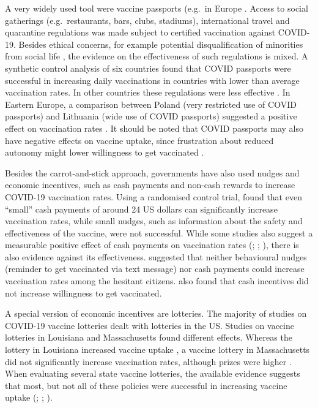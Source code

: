 \documentclass{scrbook}
\begin{document}
A very widely used tool were vaccine passports (e.g.~in Europe
\parencite{niestadt_domestic_2021}. Access to social gatherings
(e.g.~restaurants, bars, clubs, stadiums), international travel and
quarantine regulations was made subject to certified vaccination against
COVID-19. Besides ethical concerns, for example potential
disqualification of minorities from social life
\parencite{gostin_digital_2021}, the evidence on the effectiveness of
such regulations is mixed. A synthetic control analysis of six countries
found that COVID passports were successful in increasing daily
vaccinations in countries with lower than average vaccination rates. In
other countries these regulations were less effective
\parencite{mills_effect_2022}. In Eastern Europe, a comparison between
Poland (very restricted use of COVID passports) and Lithuania (wide use
of COVID passports) suggested a positive effect on vaccination rates
\parencite{walkowiak_covid-19_2021}. It should be noted that COVID
passports may also have negative effects on vaccine uptake, since
frustration about reduced autonomy might lower willingness to get
vaccinated \parencite{porat_vaccine_2021}.

Besides the carrot-and-stick approach, governments have also used nudges
and economic incentives, such as cash payments and non-cash rewards to
increase COVID-19 vaccination rates. Using a randomised control trial,
\textcite{campos-mercade_monetary_2021} found that even ``small'' cash
payments of around 24 US dollars can significantly increase vaccination
rates, while small nudges, such as information about the safety and
effectiveness of the vaccine, were not successful. While some studies
also suggest a measurable positive effect of cash payments on
vaccination rates (\cite{wong_guaranteed_2022};
\cite{kluver_incentives_2021}; \cite{kim_vaccination_2021-1}), there is
also evidence against its effectiveness. \textcite{jacobson_can_2022}
suggested that neither behavioural nudges (reminder to get vaccinated
via text message) nor cash payments could increase vaccination rates
among the hesitant citizens. \textcite{sprengholz_money_2021} also found
that cash incentives did not increase willingness to get vaccinated.

A special version of economic incentives are lotteries. The majority of
studies on COVID-19 vaccine lotteries dealt with lotteries in the US.
Studies on vaccine lotteries in Louisiana and Massachusetts found
different effects. Whereas the lottery in Louisiana increased vaccine
uptake \parencite{wang_moving_2023}, a vaccine lottery in Massachusetts
did not significantly increase vaccination rates, although prizes were
higher \parencite{kim_did_2023}. When evaluating several state vaccine
lotteries, the available evidence suggests that most, but not all of
these policies were successful in increasing vaccine uptake
(\cite{robertson_are_2021}; \cite{acharya_implementation_2021};
\cite{fuller_assessing_2022}).
\end{document}
